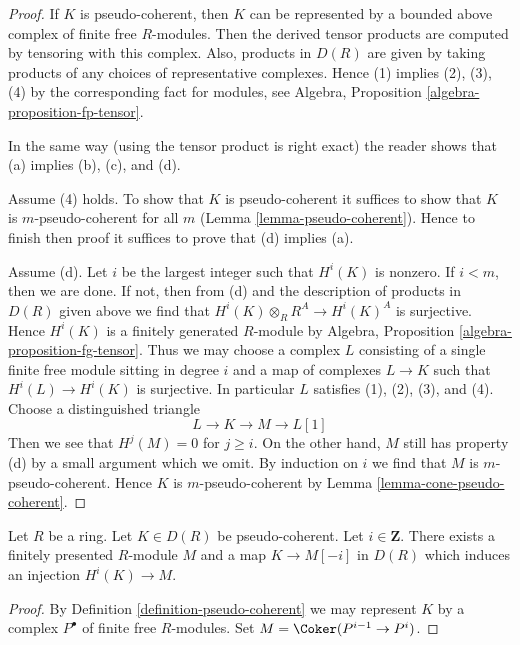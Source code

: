 \begin{proof}
If $K$ is pseudo-coherent, then $K$ can be represented by
a bounded above complex of finite free $R$-modules.
Then the derived tensor products are computed by
tensoring with this complex. Also, products in $D(R)$
are given by taking products of any choices of representative
complexes. Hence (1) implies (2), (3), (4) by the corresponding
fact for modules, see Algebra, Proposition \ref{algebra-proposition-fp-tensor}.

\medskip\noindent
In the same way (using the tensor product is right exact)
the reader shows that (a) implies (b), (c), and (d).

\medskip\noindent
Assume (4) holds. To show that $K$ is pseudo-coherent
it suffices to show that $K$ is $m$-pseudo-coherent for
all $m$ (Lemma \ref{lemma-pseudo-coherent}). Hence to finish then proof it
suffices to prove that (d) implies (a).

\medskip\noindent
Assume (d). Let $i$ be the largest integer such that
$H^i(K)$ is nonzero. If $i < m$, then we are done.
If not, then from (d) and the description of products in $D(R)$
given above we find that $H^i(K) \otimes_R R^A \to H^i(K)^A$
is surjective. Hence $H^i(K)$ is a finitely generated $R$-module by
Algebra, Proposition \ref{algebra-proposition-fg-tensor}.
Thus we may choose a complex $L$ consisting of a single finite
free module sitting in degree $i$ and a map of complexes $L \to K$
such that $H^i(L) \to H^i(K)$ is surjective. In particular $L$
satisfies (1), (2), (3), and (4). Choose a distinguished
triangle
$$
L \to K \to M \to L[1]
$$
Then we see that $H^j(M) = 0$ for $j \geq i$.
On the other hand, $M$ still has property (d) by a small argument
which we omit. By induction on $i$ we find that $M$ is
$m$-pseudo-coherent. Hence $K$ is $m$-pseudo-coherent
by Lemma \ref{lemma-cone-pseudo-coherent}.
\end{proof}

\begin{lemma}
\label{lemma-detect-cohomology-pseudo-coherent}
Let $R$ be a ring. Let $K \in D(R)$ be pseudo-coherent.
Let $i \in \mathbf{Z}$. There exists a finitely presented
$R$-module $M$ and a map $K \to M[-i]$ in $D(R)$ which induces
an injection $H^i(K) \to M$.
\end{lemma}

\begin{proof}
By Definition \ref{definition-pseudo-coherent} we may represent
$K$ by a complex $P^\bullet$
of finite free $R$-modules. Set $M = \Coker(P^{i - 1} \to P^i)$.
\end{proof}

